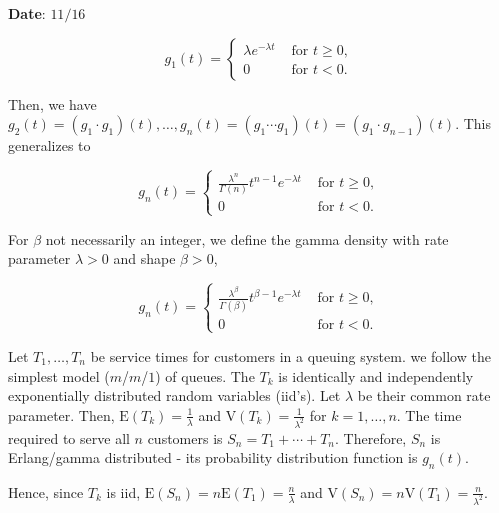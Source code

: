 \documentclass[12pt]{article}
\newcommand{\expected}[1]{\text{E}(#1)}
\newcommand{\variance}[1]{\text{V}(#1)}
\begin{document}
\begin{flushright}
\textbf{Date}: $11/16$
\end{flushright}

\noindent
\[ g_1(t) = \begin{cases} 
      \lambda e^{- \lambda t} & \text{ for } t \geq 0, \\
      0 & \text{ for } t < 0.
      \end{cases} \]

\noindent
Then, we have $g_2(t) = (g_1 \cdot g_1)(t), \ldots, g_n (t) = (g_1 \cdots g_1)(t) = (g_1 \cdot g_{n-1})(t)$. This generalizes to

\[ g_n(t) = \begin{cases} 
      \frac{\lambda^{n}}{\Gamma(n)} t^{n -1} e^{- \lambda t} & \text{ for } t \geq 0, \\
      0 & \text{ for } t < 0.
      \end{cases} \]
      
\noindent
For $\beta$ not necessarily an integer, we define the gamma density with rate parameter $\lambda > 0$ and shape $\beta > 0$, 

\[ g_n(t) = \begin{cases} 
      \frac{\lambda^{\beta}}{\Gamma(\beta)} t^{\beta -1} e^{- \lambda t} & \text{ for } t \geq 0, \\
      0 & \text{ for } t < 0.
      \end{cases} \]
      
\noindent
Let $T_1, \ldots, T_n$ be service times for customers in a queuing system. we follow the simplest model ($m$/$m$/$1$) of queues. The $T_k$ is identically and independently exponentially distributed random variables (iid's). Let $\lambda$ be their common rate parameter. Then, $\expected{T_k} = \frac{1}{\lambda}$ and $\variance{T_k} = \frac{1}{\lambda^2}$ for $k = 1, \ldots, n$. The time required to serve all $n$ customers is $S_n = T_1 + \cdots + T_n$. Therefore, $S_n$ is Erlang/gamma distributed - its probability distribution function is $g_n(t)$.

Hence, since $T_k$ is iid, $\expected{S_n} = n \expected{T_1} = \frac{n}{\lambda}$ and $\variance{S_n} = n \variance{T_1} = \frac{n}{\lambda^2}$. 
\end{document}
